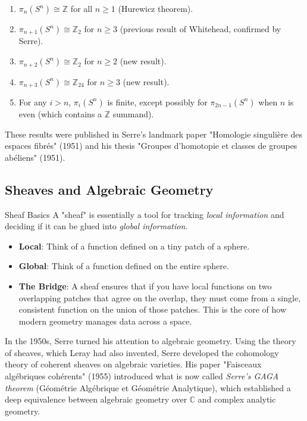 \begin{enumerate}
\item $\pi_n(S^n) \cong \mathbb{Z}$ for all $n \geq 1$ (Hurewicz theorem).
\item $\pi_{n+1}(S^n) \cong \mathbb{Z}_2$ for $n \geq 3$ (previous result of Whitehead, confirmed by Serre).
\item $\pi_{n+2}(S^n) \cong \mathbb{Z}_2$ for $n \geq 2$ (new result).
\item $\pi_{n+3}(S^n) \cong \mathbb{Z}_{24}$ for $n \geq 3$ (new result).
\item For any $i > n$, $\pi_i(S^n)$ is finite, except possibly for $\pi_{2n-1}(S^n)$ when $n$ is even (which contains a $\mathbb{Z}$ summand).
\end{enumerate}

These results were published in Serre's landmark paper "Homologie singulière des espaces fibrés" (1951) and his thesis "Groupes d'homotopie et classes de groupes abéliens" (1951).

\subsection{Sheaves and Algebraic Geometry}

\begin{knowledgebridge}{Sheaf Basics}
A "sheaf" is essentially a tool for tracking \emph{local information} and deciding if it can be glued into \emph{global information}.
\begin{itemize}
    \item \textbf{Local}: Think of a function defined on a tiny patch of a sphere.
    \item \textbf{Global}: Think of a function defined on the entire sphere.
    \item \textbf{The Bridge}: A sheaf ensures that if you have local functions on two overlapping patches that agree on the overlap, they must come from a single, consistent function on the union of those patches. This is the core of how modern geometry manages data across a space.
\end{itemize}
\end{knowledgebridge}

In the 1950s, Serre turned his attention to algebraic geometry. Using the theory of sheaves, which Leray had also invented, Serre developed the cohomology theory of coherent sheaves on algebraic varieties. His paper "Faisceaux algébriques cohérents" (1955) introduced what is now called \emph{Serre's GAGA theorem} (Géométrie Algébrique et Géométrie Analytique), which established a deep equivalence between algebraic geometry over $\mathbb{C}$ and complex analytic geometry.


